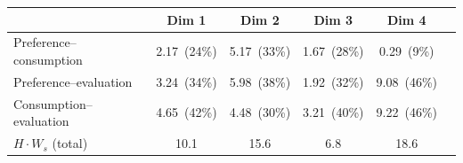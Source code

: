 \begin{tabular}{lccccc}
\toprule
 & Dim 1 & Dim 2 & Dim 3 & Dim 4 \\
\midrule
Preference--consumption & 2.17~(24\%) & 5.17~(33\%) & 1.67~(28\%) & 0.29~(9\%) \\
Preference--evaluation & 3.24~(34\%) & 5.98~(38\%) & 1.92~(32\%) & 9.08~(46\%) \\
Consumption--evaluation & 4.65~(42\%) & 4.48~(30\%) & 3.21~(40\%) & 9.22~(46\%) \\
\midrule
$H \cdot W_s$ (total) & 10.1 & 15.6 & 6.8 & 18.6 \\
\bottomrule
\end{tabular}
